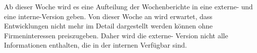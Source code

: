 Ab dieser Woche wird es eine Aufteilung der Wochenberichte in eine externe- und eine interne-Version geben. Von dieser Woche an wird erwartet, dass Entwicklungen nicht mehr im Detail dargestellt werden können ohne Firmeninteressen preiszugeben. Daher wird die externe- Version nicht alle Informationen enthalten, die in der internen Verfügbar sind.